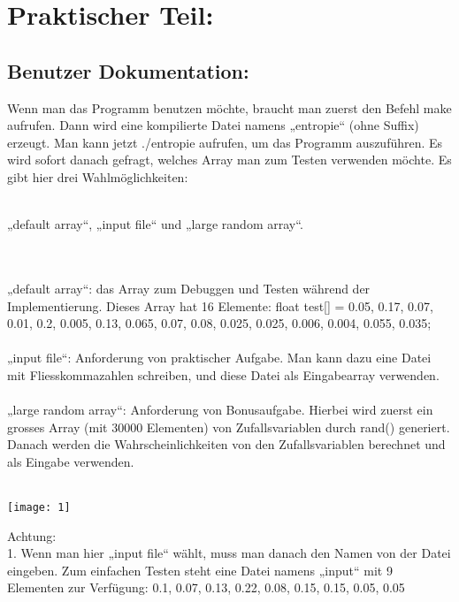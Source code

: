 \documentclass[11pt]{article}
\begin{document}
 




\section{Praktischer Teil:}
\subsection{Benutzer Dokumentation:}

Wenn man das Programm benutzen m\"ochte, braucht man zuerst den Befehl {\color{red}make} aufrufen. Dann wird eine kompilierte Datei namens „entropie“ (ohne Suffix) erzeugt. Man kann jetzt {\color{red}./entropie} aufrufen, um das Programm auszuf\"uhren.
Es wird sofort danach gefragt, welches Array man zum Testen verwenden m\"ochte. Es gibt hier drei Wahlm\"oglichkeiten:\\ \\\centerline{{\color{red}„default array“}, {\color{red}„input file“} und {\color{red}„large random array“}.}  \\\\
{\color{red}„default array“}: das Array zum Debuggen und Testen w\"ahrend der Implementierung. Dieses  
                             Array hat 16 Elemente: float test[] = {0.05, 0.17, 0.07, 0.01, 0.2, 0.005, 0.13,  
                             0.065, 0.07, 0.08, 0.025, 0.025, 0.006, 0.004, 0.055, 0.035}; \\\\
{\color{red}„input file“}: Anforderung von praktischer Aufgabe. Man kann dazu eine Datei mit  
                      Fliesskommazahlen schreiben, und diese Datei als Eingabearray verwenden. \\\\
{\color{red}„large random array“}: Anforderung von Bonusaufgabe. Hierbei wird zuerst ein grosses Array  
                                       (mit 30000 Elementen) von Zufallsvariablen durch rand() generiert.  
                                        Danach werden die Wahrscheinlichkeiten von den Zufallsvariablen  
                                        berechnet und als Eingabe verwenden. \\\\
\centerline{\texttt{[image: 1]}}
Achtung:\\
{\LARGE 1.}	Wenn man hier „input file“ w\"ahlt, muss man danach den Namen von der Datei eingeben. Zum einfachen Testen steht eine Datei namens „input“ mit 9 Elementen zur Verf\"ugung: 0.1, 0.07, 0.13, 0.22, 0.08, 0.15, 0.15, 0.05, 0.05\\
\end{document}
